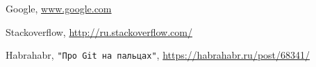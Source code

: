 \begin{thebibliography}{99999}
\singlespace\normalsize

 Google, \url{www.google.com}


 Stackoverflow, \url{http://ru.stackoverflow.com/}

 Habrahabr, \texttt{"Про Git на пальцах"}, \url{https://habrahabr.ru/post/68341/}


\end{thebibliography}
